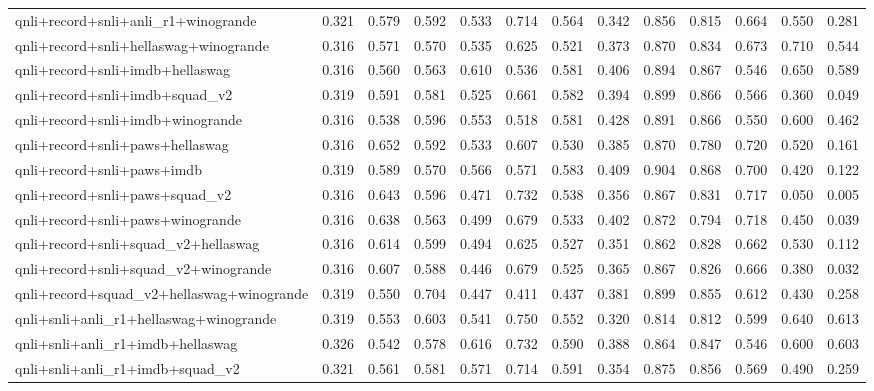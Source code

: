 \begin{table}[t]
\begin{tabular}{lrrrrrrrrrrrr}
    qnli+record+snli+anli\_r1+winogrande & 0.321 & 0.579 & 0.592 & 0.533 & 0.714 & 0.564 & 0.342 & 0.856 & 0.815 & 0.664 & 0.550 & 0.281 \\
    qnli+record+snli+hellaswag+winogrande & 0.316 & 0.571 & 0.570 & 0.535 & 0.625 & 0.521 & 0.373 & 0.870 & 0.834 & 0.673 & 0.710 & 0.544 \\
    qnli+record+snli+imdb+hellaswag & 0.316 & 0.560 & 0.563 & 0.610 & 0.536 & 0.581 & 0.406 & 0.894 & 0.867 & 0.546 & 0.650 & 0.589 \\
    qnli+record+snli+imdb+squad\_v2 & 0.319 & 0.591 & 0.581 & 0.525 & 0.661 & 0.582 & 0.394 & 0.899 & 0.866 & 0.566 & 0.360 & 0.049 \\
    qnli+record+snli+imdb+winogrande & 0.316 & 0.538 & 0.596 & 0.553 & 0.518 & 0.581 & 0.428 & 0.891 & 0.866 & 0.550 & 0.600 & 0.462 \\
    qnli+record+snli+paws+hellaswag & 0.316 & 0.652 & 0.592 & 0.533 & 0.607 & 0.530 & 0.385 & 0.870 & 0.780 & 0.720 & 0.520 & 0.161 \\
    qnli+record+snli+paws+imdb & 0.319 & 0.589 & 0.570 & 0.566 & 0.571 & 0.583 & 0.409 & 0.904 & 0.868 & 0.700 & 0.420 & 0.122 \\
    qnli+record+snli+paws+squad\_v2 & 0.316 & 0.643 & 0.596 & 0.471 & 0.732 & 0.538 & 0.356 & 0.867 & 0.831 & 0.717 & 0.050 & 0.005 \\
    qnli+record+snli+paws+winogrande & 0.316 & 0.638 & 0.563 & 0.499 & 0.679 & 0.533 & 0.402 & 0.872 & 0.794 & 0.718 & 0.450 & 0.039 \\
    qnli+record+snli+squad\_v2+hellaswag & 0.316 & 0.614 & 0.599 & 0.494 & 0.625 & 0.527 & 0.351 & 0.862 & 0.828 & 0.662 & 0.530 & 0.112 \\
    qnli+record+snli+squad\_v2+winogrande & 0.316 & 0.607 & 0.588 & 0.446 & 0.679 & 0.525 & 0.365 & 0.867 & 0.826 & 0.666 & 0.380 & 0.032 \\
    qnli+record+squad\_v2+hellaswag+winogrande & 0.319 & 0.550 & 0.704 & 0.447 & 0.411 & 0.437 & 0.381 & 0.899 & 0.855 & 0.612 & 0.430 & 0.258 \\
    qnli+snli+anli\_r1+hellaswag+winogrande & 0.319 & 0.553 & 0.603 & 0.541 & 0.750 & 0.552 & 0.320 & 0.814 & 0.812 & 0.599 & 0.640 & 0.613 \\
    qnli+snli+anli\_r1+imdb+hellaswag & 0.326 & 0.542 & 0.578 & 0.616 & 0.732 & 0.590 & 0.388 & 0.864 & 0.847 & 0.546 & 0.600 & 0.603 \\
    qnli+snli+anli\_r1+imdb+squad\_v2 & 0.321 & 0.561 & 0.581 & 0.571 & 0.714 & 0.591 & 0.354 & 0.875 & 0.856 & 0.569 & 0.490 & 0.259 \\

\end{tabular}
\end{table}
